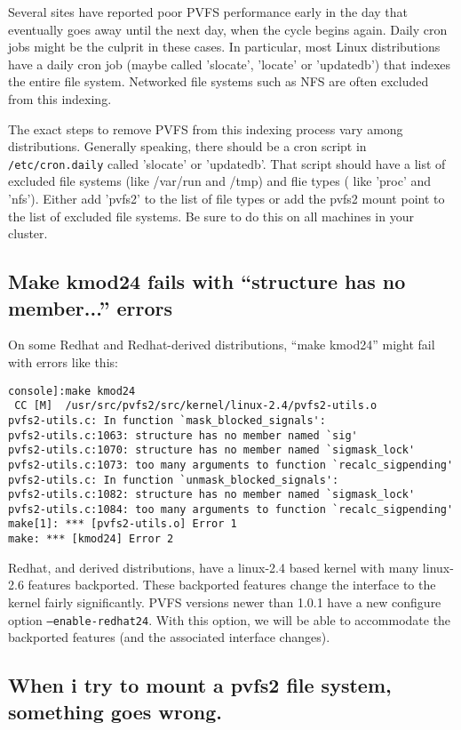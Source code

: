 \documentclass[11pt,letterpaper]{article}
\begin{document}
Several sites have reported poor PVFS performance early in the day that
eventually goes away until the next day, when the cycle begins again.  Daily
cron jobs might be the culprit in these cases.  In particular, most Linux
distributions have a daily cron job (maybe called 'slocate', 'locate' or
'updatedb') that indexes the entire file system.  Networked file systems such
as NFS are often excluded from this indexing.  

The exact steps to remove PVFS from this indexing process vary among
distributions.  Generally speaking, there should be a cron script in
\texttt{/etc/cron.daily} called 'slocate' or 'updatedb'.  That script should
have a list of excluded file systems (like /var/run and /tmp) and flie types (
like 'proc' and 'nfs').  Either add 'pvfs2' to the list of file types or add
the pvfs2 mount point to the list of excluded file systems.   Be sure to do
this on all machines in your cluster.  

\subsection{Make kmod24 fails with ``structure has no member...'' errors}

On some Redhat and Redhat-derived distributions, ``make kmod24'' might
fail with errors like this:

\begin{verbatim}
console]:make kmod24
 CC [M]  /usr/src/pvfs2/src/kernel/linux-2.4/pvfs2-utils.o
pvfs2-utils.c: In function `mask_blocked_signals':
pvfs2-utils.c:1063: structure has no member named `sig'
pvfs2-utils.c:1070: structure has no member named `sigmask_lock'
pvfs2-utils.c:1073: too many arguments to function `recalc_sigpending'
pvfs2-utils.c: In function `unmask_blocked_signals':
pvfs2-utils.c:1082: structure has no member named `sigmask_lock'
pvfs2-utils.c:1084: too many arguments to function `recalc_sigpending'
make[1]: *** [pvfs2-utils.o] Error 1
make: *** [kmod24] Error 2
\end{verbatim}

Redhat, and derived distributions, have a linux-2.4 based kernel with many
linux-2.6 features backported.  These backported features change the
interface to the kernel fairly significantly.  PVFS versions newer than
1.0.1 have a new configure option \texttt{--enable-redhat24}.  With this
option, we will be able to accommodate the backported features (and the
associated interface changes).

\subsection{When i try to mount a pvfs2 file system, something goes wrong.}
\end{document}
